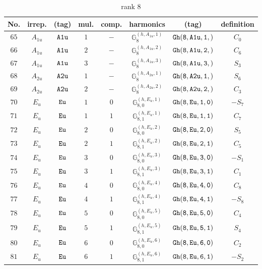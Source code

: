 \documentclass[fleqn,8pt]{jsarticle}
\begin{document}
\begin{table}[ht!]
\begin{center}
\caption{rank 8}
\renewcommand{\arraystretch}{1.3}
\begin{tabular}{cccccccc} \hline \hline
No. & irrep. & (tag) & mul. & comp. & harmonics & (tag) & definition \\ \hline
$ 65 $ & $ A_{1u} $ & $ {\tt A1u} $ & $ 1 $ & $ - $ & $ \mathbb{G}_{8}^{(h,A_{1u},1)} $ & $ {\tt Gh(8,A1u,1,)} $ & $ C_{0} $ \\
$ 66 $ & $ A_{1u} $ & $ {\tt A1u} $ & $ 2 $ & $ - $ & $ \mathbb{G}_{8}^{(h,A_{1u},2)} $ & $ {\tt Gh(8,A1u,2,)} $ & $ C_{6} $ \\
$ 67 $ & $ A_{1u} $ & $ {\tt A1u} $ & $ 3 $ & $ - $ & $ \mathbb{G}_{8}^{(h,A_{1u},3)} $ & $ {\tt Gh(8,A1u,3,)} $ & $ S_{3} $ \\
$ 68 $ & $ A_{2u} $ & $ {\tt A2u} $ & $ 1 $ & $ - $ & $ \mathbb{G}_{8}^{(h,A_{2u},1)} $ & $ {\tt Gh(8,A2u,1,)} $ & $ S_{6} $ \\
$ 69 $ & $ A_{2u} $ & $ {\tt A2u} $ & $ 2 $ & $ - $ & $ \mathbb{G}_{8}^{(h,A_{2u},2)} $ & $ {\tt Gh(8,A2u,2,)} $ & $ C_{3} $ \\
$ 70 $ & $ E_{u} $ & $ {\tt Eu} $ & $ 1 $ & $ 0 $ & $ \mathbb{G}_{8,0}^{(h,E_{u},1)} $ & $ {\tt Gh(8,Eu,1,0)} $ & $ - S_{7} $ \\
$ 71 $ & $ E_{u} $ & $ {\tt Eu} $ & $ 1 $ & $ 1 $ & $ \mathbb{G}_{8,1}^{(h,E_{u},1)} $ & $ {\tt Gh(8,Eu,1,1)} $ & $ C_{7} $ \\
$ 72 $ & $ E_{u} $ & $ {\tt Eu} $ & $ 2 $ & $ 0 $ & $ \mathbb{G}_{8,0}^{(h,E_{u},2)} $ & $ {\tt Gh(8,Eu,2,0)} $ & $ S_{5} $ \\
$ 73 $ & $ E_{u} $ & $ {\tt Eu} $ & $ 2 $ & $ 1 $ & $ \mathbb{G}_{8,1}^{(h,E_{u},2)} $ & $ {\tt Gh(8,Eu,2,1)} $ & $ C_{5} $ \\
$ 74 $ & $ E_{u} $ & $ {\tt Eu} $ & $ 3 $ & $ 0 $ & $ \mathbb{G}_{8,0}^{(h,E_{u},3)} $ & $ {\tt Gh(8,Eu,3,0)} $ & $ - S_{1} $ \\
$ 75 $ & $ E_{u} $ & $ {\tt Eu} $ & $ 3 $ & $ 1 $ & $ \mathbb{G}_{8,1}^{(h,E_{u},3)} $ & $ {\tt Gh(8,Eu,3,1)} $ & $ C_{1} $ \\
$ 76 $ & $ E_{u} $ & $ {\tt Eu} $ & $ 4 $ & $ 0 $ & $ \mathbb{G}_{8,0}^{(h,E_{u},4)} $ & $ {\tt Gh(8,Eu,4,0)} $ & $ C_{8} $ \\
$ 77 $ & $ E_{u} $ & $ {\tt Eu} $ & $ 4 $ & $ 1 $ & $ \mathbb{G}_{8,1}^{(h,E_{u},4)} $ & $ {\tt Gh(8,Eu,4,1)} $ & $ - S_{8} $ \\
$ 78 $ & $ E_{u} $ & $ {\tt Eu} $ & $ 5 $ & $ 0 $ & $ \mathbb{G}_{8,0}^{(h,E_{u},5)} $ & $ {\tt Gh(8,Eu,5,0)} $ & $ C_{4} $ \\
$ 79 $ & $ E_{u} $ & $ {\tt Eu} $ & $ 5 $ & $ 1 $ & $ \mathbb{G}_{8,1}^{(h,E_{u},5)} $ & $ {\tt Gh(8,Eu,5,1)} $ & $ S_{4} $ \\
$ 80 $ & $ E_{u} $ & $ {\tt Eu} $ & $ 6 $ & $ 0 $ & $ \mathbb{G}_{8,0}^{(h,E_{u},6)} $ & $ {\tt Gh(8,Eu,6,0)} $ & $ C_{2} $ \\
$ 81 $ & $ E_{u} $ & $ {\tt Eu} $ & $ 6 $ & $ 1 $ & $ \mathbb{G}_{8,1}^{(h,E_{u},6)} $ & $ {\tt Gh(8,Eu,6,1)} $ & $ - S_{2} $ \\
 \hline \hline
\end{tabular}
\end{center}
\end{table}
\end{document}
